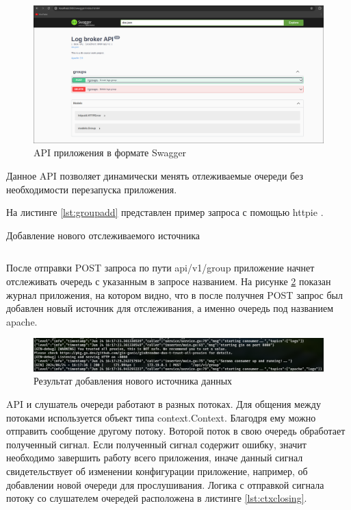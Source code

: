 \documentclass[14pt, russian]{scrartcl}
\begin{document}
\begin{figure}[H]
	\centering
	\begin{minipage}[t]{.9\textwidth}
		\centering
		\includegraphics[width=.7\textwidth]{./imgs/swagger.png}
	\end{minipage}
	\caption{API приложения в формате Swagger}
	\label{fig:api}
\end{figure}

Данное API позволяет динамически менять отлеживаемые
очереди без необходимости перезапуска
приложения.

На листинге \ref{lst:groupadd} представлен пример запроса с помощью httpie \cite{Httpiecli}.

\begin{listing}[H]
	\caption{Добавление нового отслеживаемого источника}
	\label{lst:groupadd}
	\inputminted[style=bw, frame=single,fontsize = \footnotesize, linenos=false, xleftmargin = 1.5em]{shell}{./listings/group.sh}
\end{listing}

После отправки POST запроса по пути api/v1/group приложение начнет
отслеживать очередь с указанным в запросе названием. На рисунке \ref{fig:groupadding}
показан журнал приложения, на котором видно, что в после получнея POST запрос
был добавлен новый источник для отслеживания, а именно очередь под названием
apache.

\begin{figure}[H]
	\centering
	\begin{minipage}[t]{.9\textwidth}
		\centering
		\includegraphics[width=.7\textwidth]{./imgs/addedgroup.png}
	\end{minipage}
	\caption{Результат добавления нового источника данных}
	\label{fig:groupadding}
\end{figure}


API и слушатель очереди работают в разных потоках. Для общения между потоками
используется объект типа context.Context. Благодря ему можно отправить сообщение
другому потоку. Воторой поток в свою очередь
обработает полученный сигнал. Если полученный сигнал
содержит ошибку, значит необходимо завершить работу всего приложения, иначе
данный сигнал свидетельствует об изменении конфигурации приложение, например, об
добавлении новой очереди для прослушивания. Логика с отправкой сигнала потоку
со слушателем очередей расположена в листинге \ref{lst:ctxclosing}.
\end{document}
